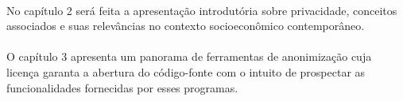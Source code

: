 \paragraph{}No capítulo 2 será feita a apresentação introdutória sobre privacidade, conceitos associados e suas relevâncias no contexto socioeconômico contemporâneo.

\paragraph{}O capítulo 3 apresenta um panorama de ferramentas de anonimização cuja licença garanta a abertura do código-fonte com o intuito de prospectar as funcionalidades fornecidas por esses programas.
